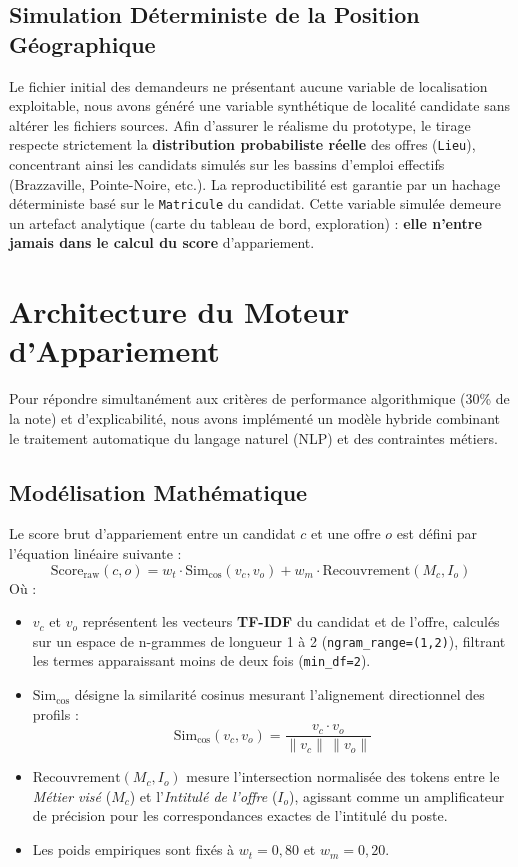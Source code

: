 \documentclass[11pt,a4paper]{article}
\newcommand{\raw}{\text{Score}_{\text{raw}}}
\begin{document}
\subsection{Simulation Déterministe de la Position Géographique}
Le fichier initial des demandeurs ne présentant aucune variable de localisation exploitable,
nous avons généré une variable synthétique de localité candidate sans altérer les fichiers
sources. Afin d'assurer le réalisme du prototype, le tirage respecte strictement la
\textbf{distribution probabiliste réelle} des offres (\texttt{Lieu}), concentrant ainsi les
candidats simulés sur les bassins d'emploi effectifs (Brazzaville, Pointe-Noire, etc.). La
reproductibilité est garantie par un hachage déterministe basé sur le \texttt{Matricule} du
candidat. Cette variable simulée demeure un artefact analytique (carte du tableau de bord,
exploration) : \textbf{elle n'entre jamais dans le calcul du score} d'appariement.

\section{Architecture du Moteur d'Appariement}
Pour répondre simultanément aux critères de performance algorithmique (30\% de la note) et
d'explicabilité, nous avons implémenté un modèle hybride combinant le traitement automatique du
langage naturel (NLP) et des contraintes métiers.

\subsection{Modélisation Mathématique}
\label{sec:math}
Le score brut d'appariement entre un candidat $c$ et une offre $o$ est défini par l'équation
linéaire suivante :
\begin{equation}
\raw(c, o) = w_t \cdot \mathrm{Sim}_{\cos}(v_c, v_o) + w_m \cdot \mathrm{Recouvrement}(M_c, I_o)
\end{equation}
Où :
\begin{itemize}
  \item $v_c$ et $v_o$ représentent les vecteurs \textbf{TF-IDF} du candidat et de l'offre,
  calculés sur un espace de n-grammes de longueur 1 à 2 (\texttt{ngram\_range=(1,2)}), filtrant
  les termes apparaissant moins de deux fois (\texttt{min\_df=2}).
  \item $\mathrm{Sim}_{\cos}$ désigne la similarité cosinus mesurant l'alignement directionnel
  des profils :
  \begin{equation}
  \mathrm{Sim}_{\cos}(v_c, v_o) = \frac{v_c \cdot v_o}{\lVert v_c \rVert\,\lVert v_o \rVert}
  \end{equation}
  \item $\mathrm{Recouvrement}(M_c, I_o)$ mesure l'intersection normalisée des tokens entre le
  \emph{Métier visé} ($M_c$) et l'\emph{Intitulé de l'offre} ($I_o$), agissant comme un
  amplificateur de précision pour les correspondances exactes de l'intitulé du poste.
  \item Les poids empiriques sont fixés à $w_t = 0{,}80$ et $w_m = 0{,}20$.
\end{itemize}
\end{document}
